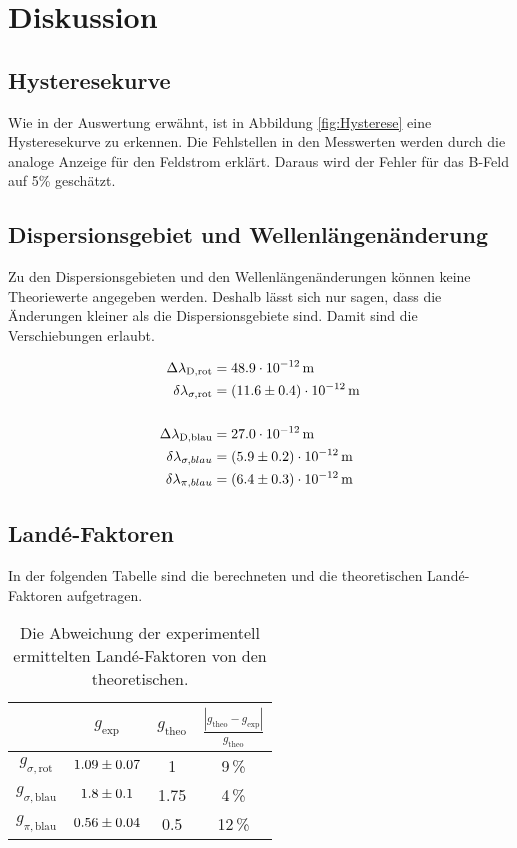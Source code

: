\section{Diskussion}
\label{sec:Diskussion}
\subsection{Hysteresekurve}
Wie in der Auswertung erwähnt, ist in Abbildung \eqref{fig:Hysterese} eine Hysteresekurve zu erkennen. Die Fehlstellen in den Messwerten werden durch die analoge Anzeige für den Feldstrom erklärt. Daraus wird der Fehler für das B-Feld auf 5\% geschätzt.


\subsection{Dispersionsgebiet und Wellenlängenänderung}
Zu den Dispersionsgebieten und den Wellenlängenänderungen können keine Theoriewerte angegeben werden. Deshalb lässt sich nur sagen, dass die Änderungen kleiner als die Dispersionsgebiete sind. Damit sind die Verschiebungen erlaubt.

\begin{align*}
  \Delta\lambda_\text{D,rot} &= 48.9 \cdot 10^{-12}\,\text{m} \\
  \delta \lambda_{\sigma,\text{rot}} &= (\num{11.6 +- 0.4})\cdot 10^{-12}\,\text{m} \\
  \\
  \Delta\lambda_\text{D,blau} &= 27.0 \cdot 10^{-12}\,\text{m} \\
  \delta \lambda_{\sigma,blau} &= (\num{5.9 +- 0.2})\cdot 10^{-12}\,\text{m} \\
  \delta \lambda_{\pi,blau} &= (\num{6.4 +- 0.3})\cdot 10^{-12}\,\text{m}
\end{align*}


\subsection{Landé-Faktoren}
In der folgenden Tabelle sind die berechneten und die theoretischen Landé-Faktoren aufgetragen.

\begin{table}[H]
   \centering
   \caption{Die Abweichung der experimentell ermittelten Landé-Faktoren von den theoretischen.}
   \label{tab:}
   \begin{tabular}{c|c|c|c}
     & $g_\text{exp}$ & $g_\text{theo}$ & $\frac{|g_\text{theo} - g_\text{exp}|}{g_\text{theo}}$ \\
     \hline
     $g_{\sigma,\text{rot}}$  & $\num{1.09 +- 0.07}$ & 1 & 9\,\% \\
     $g_{\sigma,\text{blau}}$ & $\num{1.8 +- 0.1}$   & 1.75 & 4\,\% \\
     $g_{\pi,\text{blau}}$    & $\num{0.56 +- 0.04}$ & 0.5 & 12\,\% \\
   \end{tabular}
\end{table}

